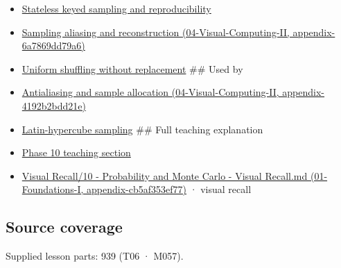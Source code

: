 \begin{itemize}
\item
  \hyperref[appendix-daaf25bfd3a0]{Stateless keyed sampling and reproducibility}
\item
  \href{}{Sampling aliasing and reconstruction (04-Visual-Computing-II, appendix-6a7869dd79a6)}
\item
  \hyperref[appendix-184fcc411663]{Uniform shuffling without replacement} \#\# Used by
\item
  \href{}{Antialiasing and sample allocation (04-Visual-Computing-II, appendix-4192b2bdd21e)}
\item
  \hyperref[appendix-1c5e85693a06]{Latin-hypercube sampling} \#\# Full teaching explanation
\item
  \href{Continuous\%20Notes/Computing\%20Foundations\%20-\%20From\%20Bits\%20to\%20C++\%20and\%20Systems\%20APIs\#6.\%20A\%20computer\%20produces\%20deterministic\%20pseudorandom\%20sequences}{Phase 10 teaching section}
\item
  \href{}{Visual Recall/10 - Probability and Monte Carlo - Visual Recall.md (01-Foundations-I, appendix-cb5af353ef77)} · visual recall
\end{itemize}

\subsection{Source coverage}\label{source-coverage}

Supplied lesson parts: 939 (T06 · M057).
